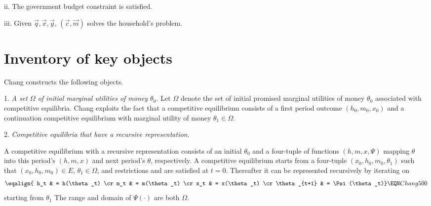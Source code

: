\item{ii.} The government budget constraint  is satisfied.

\item{iii.} Given $\vec q, \vec x, \vec y$, $(\vec c, \vec m)$ solves the  household's problem.




\section{Inventory of key objects}

Chang constructs the following objects.




\medskip
\item{1.}  {\it A set $\Omega$ of initial marginal utilities  of money $\theta_0$.}
\medskip
\noindent Let $\Omega$ denote the set of initial promised marginal utilities of money  $\theta_0$ associated with competitive equilibria.
Chang exploits the fact  that a competitive equilibrium consists of a first period outcome $(h_0, m_0, x_0)$ and a continuation competitive equilibrium with marginal utility of money $\theta _1 \in \Omega$.


\medskip
\item{2.}  {\it Competitive equilibria that have a recursive representation.}
\medskip


\noindent A competitive equilibrium with a recursive representation consists of an initial $\theta_0$ and a four-tuple of functions
$(h, m, x, \Psi)$ mapping $\theta$ into  this period's $(h, m, x)$   and next period's $\theta$, respectively.  A competitive equilibrium starts from a four-tuple $(x_0, h_0, m_0, \theta_1)$ such that $(x_0, h_0, m_0) \in E$,
 $\theta_1 \in \Omega$, and  restrictions  and     are satisfied at $t=0$.  Thereafter it can be represented recursively
by iterating on
$$ \eqalign{ h_t & = h(\theta_t) \cr
             m_t & = m(\theta_t) \cr
             x_t & = x(\theta_t) \cr
             \theta_{t+1} & = \Psi(\theta_t)}\EQN Chang500 $$
starting from $\theta_1$ The range and domain of $\Psi(\cdot)$ are both $\Omega$.


